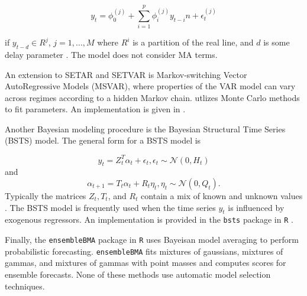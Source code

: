$$ y_t = \phi_0^{(j)} + \sum_{i=1}^p \phi_i^{(j)} y_{t-i}n+ \epsilon_t^{(j)}$$

if $y_{t-d} \in R^j$, $j = 1, \dots, M$ where $R^i$ is a partition of the real line, and $d$ is some delay parameter \cite{baystarThesis}. The model does not consider MA terms.

An extension to SETAR and SETVAR is Markov-switching Vector AutoRegressive Models (MSVAR), where properties of the VAR model can vary across regimes according to a hidden Markov chain.  \cite{MSBVAR} utlizes Monte Carlo methods to fit parameters.  An implementation is given in \cite{MSBVARR}.

Another Bayesian modeling procedure is the Bayesian Structural Time Series (BSTS) model.  The general form for a BSTS model is 

$$y_t = Z_t^T\alpha_t + \epsilon_t,  \epsilon_t \sim \mathcal{N}(0,H_t)$$  and $$\alpha_{t+1} = T_t\alpha_t + R_t\eta_t, \eta_t \sim \mathcal{N}(0,Q_t).$$  Typically the matrices $Z_t, T_t$, and $R_t$ contain a mix of known and unknown values \cite{bsts}.  The BSTS model is frequently used when the time series $y_t$ is influenced by exogenous regressors.  An implementation is provided in the {\tt bsts} package in {\tt R} \cite{bstsR}. 

Finally, the {\tt ensembleBMA} package in {\tt R} \cite{BMA} uses Bayeisan model averaging to perform probabilistic forecasting.  {\tt ensembleBMA} fits mixtures of gaussians, mixtures of gammas, and mixtures of gammas with point masses and computes scores for ensemble forecasts.  None of these methods use automatic model selection techniques.

